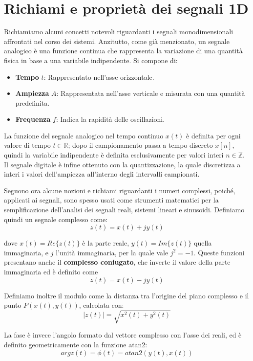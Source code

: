 %

\section{Richiami e proprietà dei segnali 1D}
Richiamiamo alcuni concetti notevoli riguardanti i segnali monodimensionali affrontati nel corso dei sistemi. Anzitutto, come già menzionato, un
segnale analogico è una funzione continua che rappresenta la variazione di una quantità fisica in base a una variabile indipendente. Si compone di:
\begin{itemize}
	\item \textbf{Tempo} $t$: Rappresentato nell'asse orizzontale.
	\item \textbf{Ampiezza} $A$: Rappresentata nell'asse verticale e misurata con una quantità predefinita.
	\item \textbf{Frequenza} $f$: Indica la rapidità delle oscillazioni.
\end{itemize}

\noindent La funzione del segnale analogico nel tempo continuo $x(t)$ è definita per ogni valore di tempo $t\in\mathbb{R}$; dopo il campionamento passa
a tempo discreto $x[n]$, quindi la variabile indipendente è definita esclusivamente per valori interi $n\in\mathbb{Z}$. Il segnale digitale è infine
ottenuto con la quantizzazione, la quale discretizza a interi i valori dell'ampiezza all'interno degli intervalli campionati.\par
Seguono ora alcune nozioni e richiami riguardanti i numeri complessi, poiché, applicati ai segnali, sono spesso usati come strumenti matematici per la
semplificazione dell'analisi dei segnali reali, sistemi lineari e sinusoidi. Definiamo quindi un segnale complesso come: \[
    z(t) = x(t) + jy(t)
\]

\noindent dove $x(t) = Re\{z(t)\}$ è la parte reale, $y(t) = Im\{z(t)\}$ quella immaginaria, e $j$ l'unità immaginaria, per la quale vale $j^2 = -1$.
Queste funzioni presentano anche il \textbf{complesso coniugato}, che inverte il valore della parte immaginaria ed è definito come \[
    z(t) = x(t) - jy(t)
\]

\noindent Definiamo inoltre il modulo come la distanza tra l'origine del piano complesso e il punto $P(x(t), y(t))$, calcolata con: \[
    |z(t)| = \sqrt{x^2(t) + y^2(t)}
\]

\noindent La fase è invece l'angolo formato dal vettore complesso con l'asse dei reali, ed è definito geometricamente con la funzione atan2: \[
    argz(t) = \phi(t) = atan2(y(t), x(t))
\]

